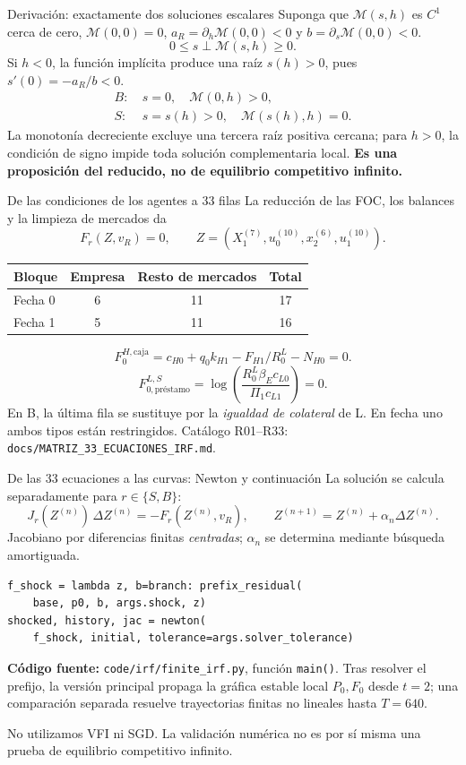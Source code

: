 \documentclass[aspectratio=169,11pt]{beamer}
\begin{document}
\begin{frame}{Derivación: exactamente dos soluciones escalares}
\small
Suponga que $\mathcal M(s,h)$ es $C^1$ cerca de cero,
$\mathcal M(0,0)=0$, $a_R=\partial_h\mathcal M(0,0)<0$
y $b=\partial_s\mathcal M(0,0)<0$.
\[
0\leq s\perp \mathcal M(s,h)\geq0.
\]
Si $h<0$, la función implícita produce una
raíz $s(h)>0$, pues $s'(0)=-a_R/b<0$.
\[
\boxed{\begin{aligned}
B:&\ s=0,\quad \mathcal M(0,h)>0,\\
S:&\ s=s(h)>0,\quad \mathcal M(s(h),h)=0.
\end{aligned}}
\]
\footnotesize
La monotonía decreciente excluye una tercera raíz
positiva cercana; para $h>0$, la condición de signo
impide toda solución complementaria local.
\textbf{Es una proposición del reducido, no de
equilibrio competitivo infinito.}
\end{frame}

\begin{frame}{De las condiciones de los agentes a 33 filas}
\small
La reducción de las FOC, los balances y la limpieza de mercados da
\[
F_r(Z,v_R)=0,\qquad
Z=(X_1^{(7)},u_0^{(10)},x_2^{(6)},u_1^{(10)}).
\]
\begin{center}
\begin{tabular}{@{}lccc@{}}\toprule
Bloque & Empresa & Resto de mercados & Total\\\midrule
Fecha 0 & 6 & 11 & 17\\
Fecha 1 & 5 & 11 & 16\\\bottomrule
\end{tabular}
\end{center}
\[
F^{H,\mathrm{caja}}_{0}
=c_{H0}+q_0k_{H1}-F_{H1}/R^L_0-N_{H0}=0.
\]
\[
F^{L,S}_{0,\mathrm{préstamo}}
=\log\left(\frac{R_0^L\beta_E c_{L0}}
{\Pi_1c_{L1}}\right)=0.
\]
\footnotesize
En B, la última fila se sustituye por la \emph{igualdad de colateral}
de L. En fecha uno ambos tipos están restringidos. Catálogo R01--R33:
\texttt{docs/MATRIZ\_33\_ECUACIONES\_IRF.md}.
\end{frame}

\begin{frame}[fragile]{De las 33 ecuaciones a las curvas: Newton y continuación}
\small
La solución se calcula separadamente para $r\in\{S,B\}$:
\[
J_r(Z^{(n)})\,\Delta Z^{(n)}=-F_r(Z^{(n)},v_R),\qquad
Z^{(n+1)}=Z^{(n)}+\alpha_n\Delta Z^{(n)}.
\]
\footnotesize
Jacobiano por diferencias finitas \emph{centradas};
$\alpha_n$ se determina mediante búsqueda amortiguada.
\medskip
\scriptsize
\begin{verbatim}
f_shock = lambda z, b=branch: prefix_residual(
    base, p0, b, args.shock, z)
shocked, history, jac = newton(
    f_shock, initial, tolerance=args.solver_tolerance)
\end{verbatim}
\footnotesize
\textbf{Código fuente:} \texttt{code/irf/finite\_irf.py}, función
\texttt{main()}. Tras resolver el prefijo, la versión principal
propaga la gráfica estable local $P_0,F_0$ desde $t=2$; una
comparación separada resuelve trayectorias finitas no lineales
hasta $T=640$.

No utilizamos VFI ni SGD. La validación numérica no es por sí
misma una prueba de equilibrio competitivo infinito.
\end{frame}
\end{document}
